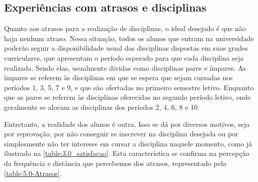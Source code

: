 \begin{apendicesenv}
  \section*{Experiências com atrasos e disciplinas} \label{sec:Experiências com atrasos e disciplinas}

  Quanto aos atrasos para a realização de disciplinas, o ideal desejado é que não haja nenhum atraso. Nessa situação, todos os alunos que entram na universidade poderão seguir a disponibilidade usual das disciplinas dispostas em suas grades curriculares, que apresentam o período esperado para que cada disciplina seja realizada. Sendo elas, usualmente dividas como disciplinas pares e ímpares. As ímpares se referem às disciplinas em que se espera que sejam cursadas nos períodos 1, 3, 5, 7 e 9, e que são ofertadas no primeiro semestre letivo. Enquanto que as pares se referem às disciplinas oferecidas no segundo período letivo, onde geralmente se alocam as disciplinas dos períodos 2, 4, 6, 8 e 10.

  Entretanto, a realidade dos alunos é outra. Isso se dá por diversos motivos, seja por reprovação, por não conseguir se inscrever na disciplina desejada ou por simplesmente não ter interesse em cursar a disciplina naquele momento, como já ilustrado na \autoref{table:3.0_satisfacao}. Esta característica se confirma na percepção da frequência e distância que percebemos dos atrasos, representado pela \autoref{table:5.0-Atrasos}.

\end{apendicesenv}
